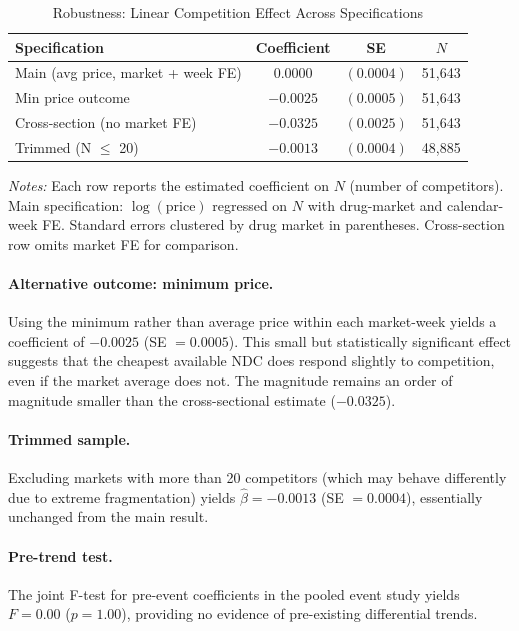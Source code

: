 \documentclass[12pt]{article}
\begin{document}
\begin{table}[H]
\centering
\caption{Robustness: Linear Competition Effect Across Specifications}\label{tab:robustness_main}
\begin{threeparttable}
\begin{tabular}{lccc}
\toprule
Specification & Coefficient & SE & $N$ \\
\midrule
Main (avg price, market + week FE) & $0.0000$ & $(0.0004)$ & 51,643 \\
Min price outcome & $-0.0025$ & $(0.0005)$ & 51,643 \\
Cross-section (no market FE) & $-0.0325$ & $(0.0025)$ & 51,643 \\
Trimmed (N $\leq$ 20) & $-0.0013$ & $(0.0004)$ & 48,885 \\
\bottomrule
\end{tabular}
\begin{tablenotes}[flushleft]
\small
\item \textit{Notes:} Each row reports the estimated coefficient on $N$ (number of competitors). Main specification: $\log(\text{price})$ regressed on $N$ with drug-market and calendar-week FE. Standard errors clustered by drug market in parentheses. Cross-section row omits market FE for comparison.
\end{tablenotes}
\end{threeparttable}
\end{table}

\paragraph{Alternative outcome: minimum price.} Using the minimum rather than average price within each market-week yields a coefficient of $-0.0025$ (SE $= 0.0005$). This small but statistically significant effect suggests that the cheapest available NDC does respond slightly to competition, even if the market average does not. The magnitude remains an order of magnitude smaller than the cross-sectional estimate ($-0.0325$).

\paragraph{Trimmed sample.} Excluding markets with more than 20 competitors (which may behave differently due to extreme fragmentation) yields $\hat{\beta} = -0.0013$ (SE $= 0.0004$), essentially unchanged from the main result.

\paragraph{Pre-trend test.} The joint F-test for pre-event coefficients in the pooled event study yields $F = 0.00$ ($p = 1.00$), providing no evidence of pre-existing differential trends.
\end{document}

